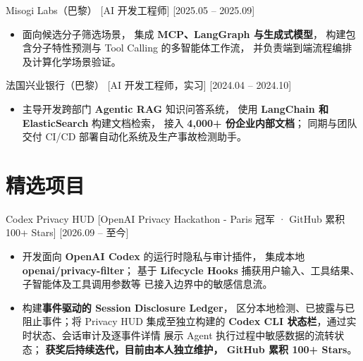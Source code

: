 \documentclass{resume}
\newlength{\EntryGap}
\newlength{\BulletGap}
\newenvironment{resumeBullets}{%
  \begin{itemize}[
    label=\textbullet,
    leftmargin=12pt,
    labelsep=5pt,
    itemsep=\BulletGap,
    parsep=0pt,
    topsep=3pt,
    partopsep=0pt
  ]
}{%
  \end{itemize}
}
\begin{document}
\vspace{\EntryGap}

\ResumeItem
  {Misogi Labs（巴黎）}
  [AI 开发工程师]
  [2025.05 -- 2025.09]

\begin{resumeBullets}
  \item 面向候选分子筛选场景，
  集成 \textbf{MCP、LangGraph 与生成式模型}，
  构建包含分子特性预测与 Tool Calling 的多智能体工作流，
  并负责端到端流程编排及计算化学场景验证。
\end{resumeBullets}

\vspace{\EntryGap}

\ResumeItem
  {法国兴业银行（巴黎）}
  [AI 开发工程师，实习]
  [2024.04 -- 2024.10]

\begin{resumeBullets}
  \item 主导开发跨部门 \textbf{Agentic RAG} 知识问答系统，
  使用 \textbf{LangChain 和 ElasticSearch} 构建文档检索，
  接入 \textbf{4,000+ 份企业内部文档}；
  同期与团队交付 CI/CD 部署自动化系统及生产事故检测助手。
\end{resumeBullets}


\section{精选项目}

\ResumeItem
  {Codex Privacy HUD}
  [OpenAI Privacy Hackathon - Paris 冠军 · GitHub 累积 100+ Stars]
  [2026.09 -- 至今]

\begin{resumeBullets}
  \item 开发面向 \textbf{OpenAI Codex} 的运行时隐私与审计插件，
  集成本地 \textbf{openai/privacy-filter}；
  基于 \textbf{Lifecycle Hooks}
  捕获用户输入、工具结果、子智能体及工具调用参数等
  已接入边界中的敏感信息流。

  \item 构建\textbf{事件驱动的 Session Disclosure Ledger}，
  区分本地检测、已披露与已阻止事件；将 Privacy HUD 集成至独立构建的
  \textbf{Codex CLI 状态栏}，通过实时状态、会话审计及逐事件详情
  展示 Agent 执行过程中敏感数据的流转状态；
  \textbf{获奖后持续迭代，目前由本人独立维护，
  GitHub 累积 100+ Stars}。
\end{resumeBullets}
\end{document}
